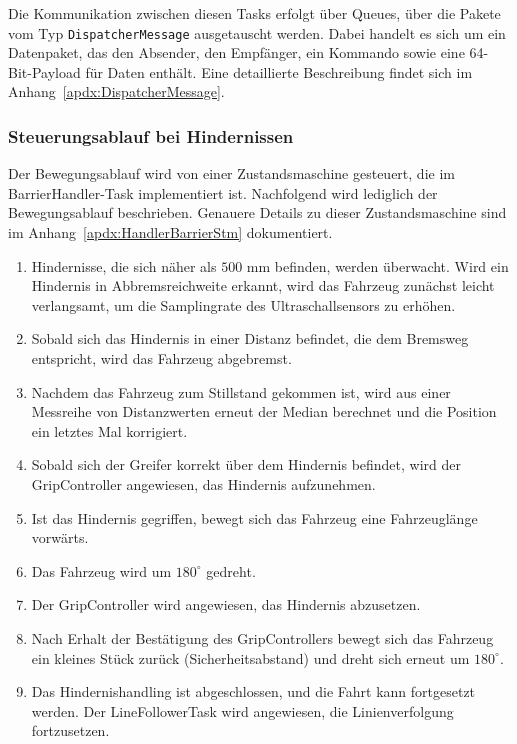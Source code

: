 \documentclass[main.tex]{subfiles} %
\begin{document}
Die Kommunikation zwischen diesen Tasks erfolgt über Queues, über die Pakete
vom Typ \texttt{DispatcherMessage} ausgetauscht werden. Dabei handelt es sich
um ein Datenpaket, das den Absender, den Empfänger, ein Kommando sowie eine
64-Bit-Payload für Daten enthält. Eine detaillierte Beschreibung findet sich im
Anhang~\ref{apdx:DispatcherMessage}.

\subsubsection*{Steuerungsablauf bei Hindernissen}

Der Bewegungsablauf wird von einer Zustandsmaschine gesteuert, die im
BarrierHandler-Task implementiert ist. Nachfolgend wird lediglich der
Bewegungsablauf beschrieben. Genauere Details zu dieser Zustandsmaschine sind
im Anhang~\ref{apdx:HandlerBarrierStm} dokumentiert.

\begin{enumerate}
    \item Hindernisse, die sich näher als $500$ mm befinden, werden überwacht. Wird ein
          Hindernis in Abbremsreichweite erkannt, wird das Fahrzeug zunächst leicht
          verlangsamt, um die Samplingrate des Ultraschallsensors zu erhöhen.

    \item Sobald sich das Hindernis in einer Distanz befindet, die dem Bremsweg
          entspricht, wird das Fahrzeug abgebremst.

    \item Nachdem das Fahrzeug zum Stillstand gekommen ist, wird aus einer Messreihe von
          Distanzwerten erneut der Median berechnet und die Position ein letztes Mal
          korrigiert.

    \item Sobald sich der Greifer korrekt über dem Hindernis befindet, wird der
          GripController angewiesen, das Hindernis aufzunehmen.

    \item Ist das Hindernis gegriffen, bewegt sich das Fahrzeug eine Fahrzeuglänge
          vorwärts.

    \item Das Fahrzeug wird um $180^\circ$ gedreht.

    \item Der GripController wird angewiesen, das Hindernis abzusetzen.

    \item Nach Erhalt der Bestätigung des GripControllers bewegt sich das Fahrzeug ein
          kleines Stück zurück (Sicherheitsabstand) und dreht sich erneut um $180^\circ$.

    \item Das Hindernishandling ist abgeschlossen, und die Fahrt kann fortgesetzt werden.
          Der LineFollowerTask wird angewiesen, die Linienverfolgung fortzusetzen.
\end{enumerate}
\end{document}
